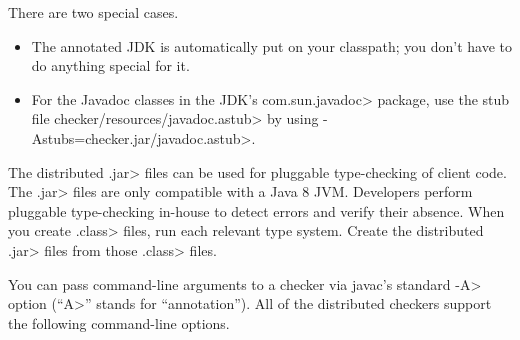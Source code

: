 
There are two special cases.
\begin{itemize}
\item
The annotated JDK is automatically put on your
classpath; you don't have to do anything special for it.
\item
For the Javadoc classes in the JDK's \<com.sun.javadoc> package,
use the stub file \<checker/resources/javadoc.astub> by using \<-Astubs=checker.jar/javadoc.astub>.
\end{itemize}



  The distributed
  \<.jar> files can be used for pluggable type-checking of client code.
  The \<.jar> files are only compatible with a Java 8
  JVM.
  Developers perform pluggable type-checking in-house to detect errors and
  verify their absence.
  When you create \<.class> files, run each relevant type system.
  Create the distributed \<.jar> files from those \<.class> files.



You can pass command-line arguments to a checker via javac's standard \<-A>
option (``\<A>'' stands for ``annotation'').  All of the distributed
checkers support the following command-line options.


